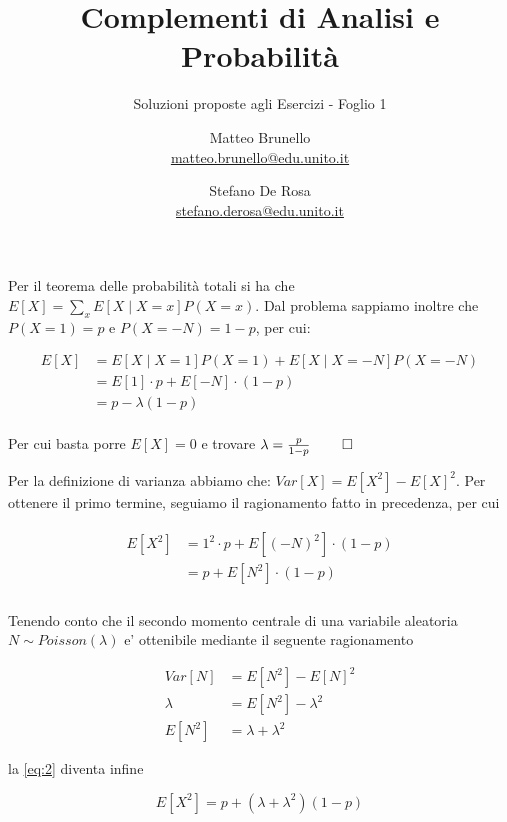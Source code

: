 \documentclass{homework}
\title{Complementi di Analisi e Probabilità}
\subtitle{Soluzioni proposte agli Esercizi - Foglio 1}
\author{Matteo Brunello\\ \href{mailto:matteo.brunello@edu.unito.it}{matteo.brunello@edu.unito.it} 
   \and Stefano De Rosa \\ \href{mailto:stefano.derosa@edu.unito.it}{stefano.derosa@edu.unito.it} }
\begin{document}
\maketitle

\exercise*[1.a] \label{1a}
Per il teorema delle probabilità totali si ha che $E[X] = \sum_x E[X \mid X = x]P(X=x)$. Dal problema sappiamo inoltre 
che $P(X = 1) = p$ e $P(X = -N) = 1-p$, per cui:

\begin{equation} \label{eq:1}
    \begin{split}
        E[X] &= E[X \mid X = 1]P(X = 1) + E[X \mid X = -N]P(X = -N)\\
        &= E[1] \cdot p + E[-N] \cdot (1-p)\\
        &= p - \lambda (1-p)\\
    \end{split}
\end{equation}

Per cui basta porre $E[X]=0$ e trovare $\lambda = \frac{p}{1-p} \; \qed$

\exercise*[1.b]
Per la definizione di varianza abbiamo che: $Var[X] = E[X^2] - E[X]^2$. Per ottenere il primo termine, seguiamo il
ragionamento fatto in precedenza, per cui

\begin{align} \label{eq:2}
    \begin{split}
        E[X^2] &= 1^2 \cdot p + E[(-N)^2] \cdot (1 - p)\\
        &= p + E[N^2] \cdot (1 - p)\\
    \end{split}
\end{align}

Tenendo conto che il secondo momento centrale di una variabile aleatoria $N \sim Poisson(\lambda)$ e' ottenibile 
mediante il seguente ragionamento

\begin{equation}
    \begin{split}
        Var[N] &= E[N^2] - E[N]^2\\
        \lambda &= E[N^2] - \lambda^2\\
        E[N^2] &= \lambda + \lambda^2
    \end{split}
\end{equation}

la \ref{eq:2} diventa infine

\begin{equation} \label{eq:3}
    E[X^2] = p + (\lambda + \lambda^2) (1 - p)
\end{equation}
\end{document}
